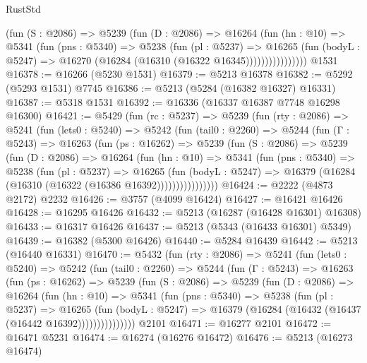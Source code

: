 \begin{lexlean}{RustStd}
\begin{coremodule}
                  (fun (S : @2086) =>
                  @5239
                    (fun (D : @2086) =>
                    @16264
                      (fun (hn : @10) =>
                      @5341
                        (fun (pns : @5340) =>
                        @5238
                          (fun (pl : @5237) =>
                          @16265
                            (fun (bodyL : @5247) =>
                            @16270 (@16284 (@16310 (@16322 @16345))))))))))))))))
    @1531
@16378 := @16266 (@5230 @1531)
@16379 := @5213 @16378
@16382 := @5292 (@5293 @1531) @7745
@16386 := @5213 (@5284 (@16382 @16327) @16331)
@16387 := @5318 @1531
@16392 := @16336 (@16337 @16387 @7748 @16298 @16300)
@16421 := @5429
    (fun (rc : @5237) =>
    @5239
      (fun (rty : @2086) =>
      @5241
        (fun (lets0 : @5240) =>
        @5242
          (fun (tail0 : @2260) =>
          @5244
            (fun (Γ : @5243) =>
            @16263
              (fun (ps : @16262) =>
              @5239
                (fun (S : @2086) =>
                @5239
                  (fun (D : @2086) =>
                  @16264
                    (fun (hn : @10) =>
                    @5341
                      (fun (pns : @5340) =>
                      @5238
                        (fun (pl : @5237) =>
                        @16265
                          (fun (bodyL : @5247) =>
                          @16379 (@16284 (@16310 (@16322 (@16386 @16392))))))))))))))))
@16424 := @2222 (@4873 @2172) @2232
@16426 := @3757 (@4099 @16424)
@16427 := @16421 @16426
@16428 := @16295 @16426
@16432 := @5213 (@16287 (@16428 @16301) @16308)
@16433 := @16317 @16426
@16437 := @5213 (@5343 (@16433 @16301) @5349)
@16439 := @16382 (@5300 @16426)
@16440 := @5284 @16439
@16442 := @5213 (@16440 @16331)
@16470 := @5432
    (fun (rty : @2086) =>
    @5241
      (fun (lets0 : @5240) =>
      @5242
        (fun (tail0 : @2260) =>
        @5244
          (fun (Γ : @5243) =>
          @16263
            (fun (ps : @16262) =>
            @5239
              (fun (S : @2086) =>
              @5239
                (fun (D : @2086) =>
                @16264
                  (fun (hn : @10) =>
                  @5341
                    (fun (pns : @5340) =>
                    @5238
                      (fun (pl : @5237) =>
                      @16265
                        (fun (bodyL : @5247) =>
                        @16379 (@16284 (@16432 (@16437 (@16442 @16392)))))))))))))))
    @2101
@16471 := @16277 @2101
@16472 := @16471 @5231
@16474 := @16274 (@16276 @16472)
@16476 := @5213 (@16273 @16474)

\end{coremodule}
\end{lexlean}
